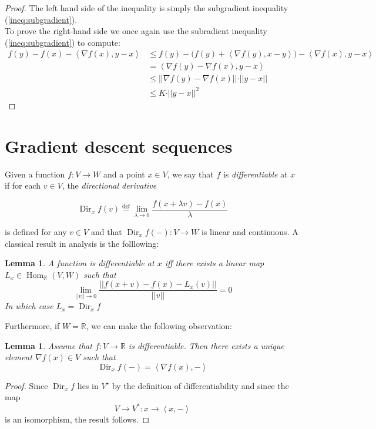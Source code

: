 \documentclass{book}
\theoremstyle{plain}
\newtheorem{lemma}[corollary]{Lemma}
\theoremstyle{definition}
\newcommand{\bl}[2]{\left\langle #1,#2\right\rangle}
\renewcommand{\d}[1]{\mathbb{#1}}
\DeclareMathOperator{\Dir}{Dir}
\newcommand{\define}{\stackrel{\operatorname{def}}{=}}
\DeclareMathOperator{\Hom}{Hom}
\newcommand{\mor}{\longrightarrow}
\begin{document}
\begin{proof}
The left hand side of the inequality is simply the subgradient inequality (\ref{ineq:subgradient}).\\
To prove the right-hand side we once again use the subradient inequality (\ref{ineq:subgradient}) to compute:
\begin{align*}
f(y)-f(x)-\bl{\nabla f(x)}{y-x}&\le f(y)-\bigg(f(y)+\bl{\nabla f(y)}{x-y}\bigg)-\bl{\nabla f(x)}{y-x}\\
&=\bl{\nabla f(y)-\nabla f(x)}{y-x}\\
&\le \vert \vert \nabla f(y)-\nabla f(x)\vert \vert \cdot \vert \vert y-x\vert \vert\\
&\le K\cdot \vert \vert y-x\vert \vert ^2
\end{align*}

\end{proof}

\section{Gradient descent sequences}

Given a function $f:V\mor W$ and a point $x\in V$, we say that $f$ is \emph{differentiable} at $x$ if for each $v \in V$, the \emph{directional derivative}

\[
\Dir_xf(v)\define \lim_{\lambda \to 0}\frac{f(x+\lambda v)-f(x)}{\lambda}
\]

\noindent is defined for any $v \in V$  and  that  $\Dir_xf(-):V\mor W$ is linear and continuous. A classical result in analysis is the folllowing:
\begin{lemma}\label{lem:eq_defs_diff}
A function is differentiable at $x$ iff there exists a linear map $L_x \in \Hom_\d{R}(V,W)$ such that
\[
\lim_{\vert \vert v \vert \vert \mor 0}\frac{\vert \vert f(x+v)-f(x)-L_x(v)\vert \vert}{\vert \vert v\vert \vert}=0
\]
In which case $L_x=\Dir_xf$
\end{lemma}
Furthermore, if $W=\d{R}$, we can make the following observation:

\begin{lemma}
Assume that $f:V\mor \d{R}$ is differentiable. Then there exists a unique element $\nabla f(x) \in V$ such that 
\[
\Dir_xf(-)=\bl{\nabla f(x)}{-}
\]
\end{lemma}
 \begin{proof}
 Since $\Dir_xf$ lies in $V^\star$ by the definition of differentiability and since the map \[V\mor V^*:x\mor \bl{x}{-} \]	is an isomorphism, the result follows.
 \end{proof}
\end{document}
